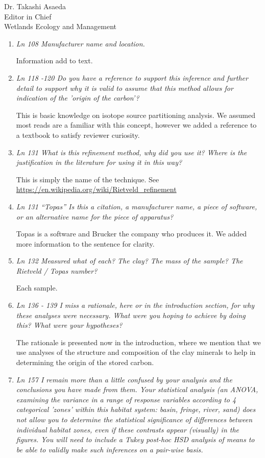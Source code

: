 \documentclass[11pt]{bgcletter}
\begin{document}
\begin{letter}{Dr. Takashi Asaeda\\
 Editor in Chief \\ Wetlands Ecology and Management}
\begin{enumerate}
{\color{blue} These are standard soil processing protocols.}

\item {\it Ln 108 Manufacturer name and location.}

{\color{blue} Information add to text.}

\item {\it Ln 118 -120 Do you have a reference to support this inference and further detail to support why it is valid to assume that this method allows for indication of the 'origin of the carbon'?}

{\color{blue} This is basic knowledge on isotope source partitioning analysis. We assumed most reads are a familiar with this concept, however we added a reference to a textbook to satisfy reviewer curiosity. }

\item {\it Ln 131 What is this refinement method, why did you use it? Where is the justification in the literature for using it in this way?}

{\color{blue} This is simply the name of the technique. See \url{https://en.wikipedia.org/wiki/Rietveld_refinement}}

\item {\it Ln 131 ``Topas'' Is this a citation, a manufacturer name, a piece of software, or an alternative name for the piece of apparatus?}

{\color{blue} Topas is a software and Brucker the company who produces it. We added more information to the sentence for clarity.}

\item {\it Ln 132 Measured what of each? The clay? The mass of the sample? The Rietveld / Topas number?}

{\color{blue} Each sample.}

\item {\it Ln 136 - 139 I miss a rationale, here or in the introduction section, for why these analyses were necessary. What were you hoping to achieve by doing this? What were your hypotheses?}

{\color{blue} The rationale is presented now in the introduction, where we mention that we use analyses of the structure and composition of the clay minerals to help in determining the origin of the stored carbon.}

\item {\it Ln 157 I remain more than a little confused by your analysis and the conclusions you have made from them. Your statistical analysis (an ANOVA, examining the variance in a range of response variables according to 4 categorical 'zones' within this habitat system: basin, fringe, river, sand) does not allow you to determine the statistical significance of differences between individual habitat zones, even if these contrasts appear (visually) in the figures. You will need to include a Tukey post-hoc HSD analysis of means to be able to validly make such inferences on a pair-wise basis.}


\end{enumerate}
\end{letter}
\end{document}
